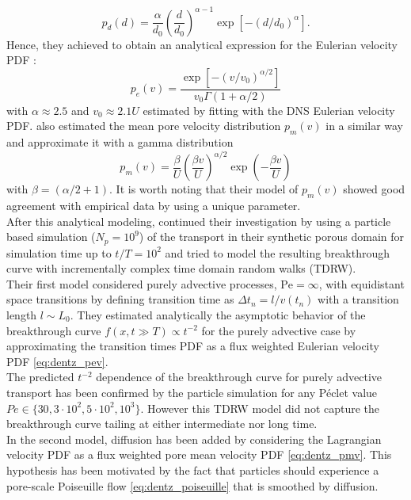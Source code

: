 \[
p_d(d)=\frac{\alpha}{d_0}\left(\frac{d}{d_0}\right)^{\alpha-1}\exp[-(d/d_0)^\alpha].
\]
Hence, they achieved to obtain an analytical expression for the Eulerian velocity PDF :
\begin{equation}\label{eq:dentz_pev}
p_e(v)=\frac{\exp[-(v/v_0)^{\alpha/2}]}{v_0\Gamma(1+\alpha/2)}
\end{equation}
with $\alpha\approx2.5$ and $v_0\approx2.1U$ estimated by fitting with the DNS Eulerian velocity PDF.
\citeauthor{Dentz2017} also estimated the mean pore velocity distribution $p_m(v)$ in a similar way and approximate it with a gamma distribution
\begin{equation}\label{eq:dentz_pmv}
p_m(v)=\frac{\beta}{U}\left(\frac{\beta v}{U}\right)^{\alpha/2}\exp\left(-\frac{\beta v}{U}\right) 
\end{equation}
with $\beta=(\alpha/2+1)$. 
It is worth noting that their model of $p_m(v)$ showed good agreement with empirical data by using a unique parameter.\\
After this analytical modeling, \citeauthor{Dentz2017} continued their investigation by using a particle based simulation ($N_p=10^9$) of the transport in their synthetic porous domain for simulation time up to $t/T=10^2$ and tried to model the resulting breakthrough curve with incrementally complex time domain random walks (TDRW).\\
Their first model considered purely advective processes, $\mathrm{Pe}=\infty$, with equidistant space transitions by defining transition time as $\Delta t_n=l/v(t_n)$ with a transition length  $l\sim L_0$. 
They estimated analytically the asymptotic behavior of the breakthrough curve $f(x,t\gg T)\propto t^{-2}$ for the purely advective case by approximating the transition times PDF as a flux weighted Eulerian velocity PDF \eqref{eq:dentz_pev}.\\
The predicted $t^{-2}$ dependence of the breakthrough curve for purely advective transport has been confirmed by the particle simulation for any Péclet value $Pe\in\{30, 3\cdot10^2, 5\cdot10^2, 10^3\}$. However this TDRW model did not capture the breakthrough curve tailing at either intermediate nor long time.\\
In the second model, diffusion has been added by considering the Lagrangian velocity PDF as a flux weighted pore mean velocity PDF \eqref{eq:dentz_pmv}. This hypothesis has been motivated by the fact that particles should experience a pore-scale Poiseuille flow \eqref{eq:dentz_poiseuille} that is smoothed by diffusion.
